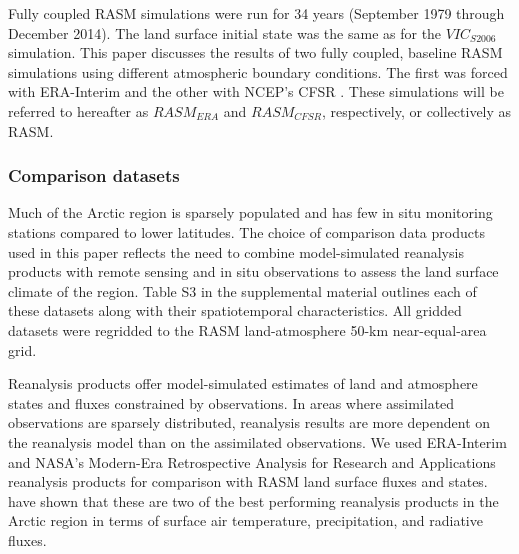 Fully coupled RASM simulations were run for 34 years (September 1979 through December 2014).
The land surface initial state was the same as for the $VIC_{S2006}$ simulation.
This paper discusses the results of two fully coupled, baseline RASM simulations using different atmospheric boundary conditions.
The first was forced with ERA-Interim \citep{Dee_2011} and the other with NCEP’s CFSR \citep{Saha_2011}.
These simulations will be referred to hereafter as $RASM_{ERA}$ and $RASM_{CFSR}$, respectively, or collectively as RASM.

\subsubsection{Comparison datasets}
\label{sec:datasets}

Much of the Arctic region is sparsely populated and has few in situ monitoring stations compared to lower latitudes.
The choice of comparison data products used in this paper reflects the need to combine model-simulated reanalysis products with remote sensing and in situ observations to assess the land surface climate of the region.
Table S3 in the supplemental material outlines each of these datasets along with their spatiotemporal characteristics.
All gridded datasets were regridded to the RASM land-atmosphere 50-km near-equal-area grid.

Reanalysis products offer model-simulated estimates of land and atmosphere states and fluxes constrained by observations.
In areas where assimilated observations are sparsely distributed, reanalysis results are more dependent on the reanalysis model than on the assimilated observations.
We used ERA-Interim \citep[also referred to hereafter as ERA; ][]{Dee_2011} and NASA’s Modern-Era Retrospective Analysis for Research and Applications \citep[MERRA; ][]{Rienecker_2011} reanalysis products for comparison with RASM land surface fluxes and states.
\citet{Lindsay_2014} have shown that these are two of the best performing reanalysis products in the Arctic region in terms of surface air temperature, precipitation, and radiative fluxes.


